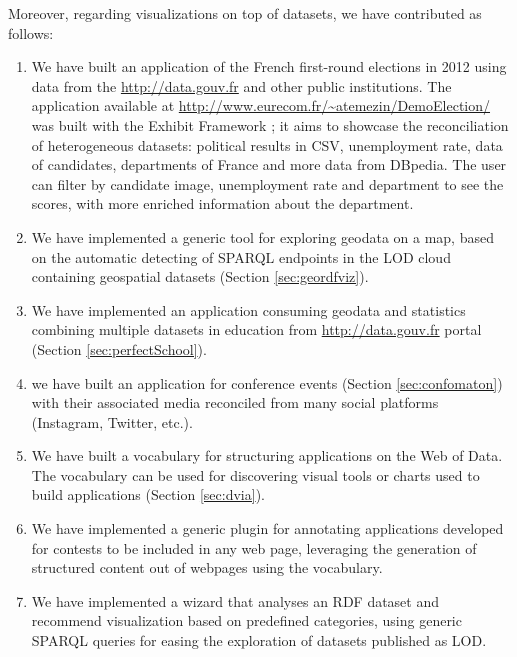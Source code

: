 Moreover, regarding visualizations on top of datasets, we have contributed as follows:
\begin{enumerate}


\item We have built an application of the French first-round elections in 2012 using data from the \url{http://data.gouv.fr} and other public institutions. The application available at \url{http://www.eurecom.fr/~atemezin/DemoElection/} was built with the Exhibit Framework \cite{exhibit2007}; it aims to showcase the reconciliation of heterogeneous datasets: political results in CSV, unemployment rate, data of candidates, departments of France and more data from DBpedia. The user can filter by candidate image, unemployment rate and department to see the scores, with more enriched information about the department.
 
\item We have implemented a generic tool for exploring geodata on a map, based on the automatic detecting of SPARQL endpoints in the LOD cloud containing geospatial datasets (Section \ref{sec:geordfviz}). 

\item We have implemented an application consuming geodata and statistics combining multiple datasets in education from \url{http://data.gouv.fr} portal (Section \ref{sec:perfectSchool}).

\item we have built an application for conference events (Section \ref{sec:confomaton}) with their associated media reconciled from many social platforms (Instagram, Twitter, etc.).

\item We have built a vocabulary for structuring applications on the Web of Data. The vocabulary can be used for discovering visual tools or charts used to build applications (Section \ref{sec:dvia}). 

\item We have implemented a generic plugin for annotating applications developed for contests to be included in any web page, leveraging  the generation of structured content out of webpages using the vocabulary. 


\item We have implemented a wizard that analyses an RDF dataset and recommend visualization based on predefined categories, using generic SPARQL queries for easing the exploration of datasets published as LOD. 


\end{enumerate}

